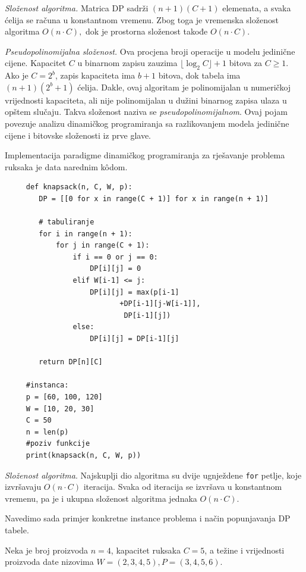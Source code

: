 \begin{solution}
	\medskip
	
	\textit{Složenost algoritma.}  Matrica $\textrm{DP}$ sadrži $(n+1)(C+1)$ elemenata, a svaka ćelija se računa u konstantnom vremenu. Zbog toga je vremenska složenost algoritma $ O(n \cdot C),$ dok je prostorna složenost takođe $O(n \cdot C).$

\textit{Pseudopolinomijalna složenost.} Ova procjena broji operacije u modelu jedinične cijene. Kapacitet $C$ u binarnom zapisu zauzima $\lfloor\log_2 C\rfloor+1$ bitova za $C\geq 1$. Ako je $C=2^b$, zapis kapaciteta ima $b+1$ bitova, dok tabela ima $(n+1)(2^b+1)$ ćelija. Dakle, ovaj algoritam je polinomijalan u numeričkoj vrijednosti kapaciteta, ali nije polinomijalan u dužini binarnog zapisa ulaza u opštem slučaju. Takva složenost naziva se \textit{pseudopolinomijalnom}. Ovaj pojam povezuje analizu dinamičkog programiranja sa razlikovanjem modela jedinične cijene i bitovske složenosti iz prve glave.
	
\end{solution}
	 
	 Implementacija paradigme dinamičkog programiranja za rješavanje pro\-blema ruksaka je data narednim k\^odom.
	 
	 \begin{verbatim}
	 def knapsack(n, C, W, p):
	 	DP = [[0 for x in range(C + 1)] for x in range(n + 1)]
	 
	 	# tabuliranje
	 	for i in range(n + 1):
	 		for j in range(C + 1):
	 			if i == 0 or j == 0:
	 				DP[i][j] = 0
	 			elif W[i-1] <= j:
	 				DP[i][j] = max(p[i-1]
	 				       +DP[i-1][j-W[i-1]],
	 				        DP[i-1][j])
	 			else:
	 				DP[i][j] = DP[i-1][j]
	 
	 	return DP[n][C]
	 
	 #instanca:
	 p = [60, 100, 120]
	 W = [10, 20, 30]
	 C = 50
	 n = len(p)
	 #poziv funkcije
	 print(knapsack(n, C, W, p))
	 \end{verbatim}
	 
 \textit{Složenost algoritma}. Najskuplji dio algoritma su dvije ugnježdene \texttt{for} petlje, koje izvršavaju $O(n \cdot C)$ iteracija. Svaka od iteracija se izvršava u konstantnom vremenu, pa je i ukupna složenost algoritma jednaka $O(n \cdot C)$.


Navedimo sada primjer konkretne instance problema i način popunjavanja DP tabele.

Neka je broj proizvoda $n=4$, kapacitet ruksaka $C=5$, a težine i vrijednosti proizvoda date nizovima $W=(2,3,4,5), P=(3,4,5,6).$

